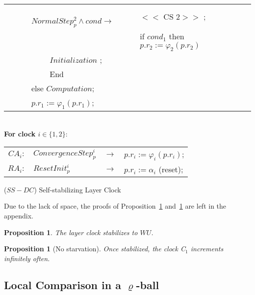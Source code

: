 \documentclass[11pt]{article}
\newtheorem{proposition}[theorem]{Proposition}
\newcommand{\text}[1]{\mbox{#1}}
\begin{document}
\begin{algorithm}
\begin{footnotesize}
\begin{tabular}{@{}rlcll}
     &&&  \  \ \ \text{  } $NormalStep_{p}^{2}\wedge cond\rightarrow $ & $<<\mbox{ CS 2}>> $  ;\\
     &&&                                                       & if $cond_1$ then $p.r_{2}:=\varphi _{2}\left(p.r_{2}\right)$  \\
     &&&\  \ \ \text{  } $Initialization$ ; & \\
      &&&  \  \ \ \text{  } End & \\ 
      &&& else $Computation$; & \\
    &&& $p.r_1 := \varphi_1(p.r_1)$; &\\
\end{tabular}\\
\noindent
{\bf For clock $i \in \{ 1,2 \}$}:\\
\noindent
\hspace*{0.3cm}
\begin{tabular}{@{}rlcl}  
$CA_i:$ & $ConvergenceStep_p^i$ & $\longrightarrow$ &
   $p.r_i := \varphi_i(p.r_i)$;\\
   
$RA_i:$ & $ResetInit_p^i$ & $\longrightarrow$ &
   $p.r_i := \alpha_i$ (reset);\\  
   

\end{tabular}
\end{footnotesize}
\caption{($SS-DC$) Self-stabilizing Layer Clock}
\label{algo:layer_clock}
\end{algorithm}


Due to the lack of space, the proofs of Proposition~\ref{cor:WUstab} and~\ref{prop:nos} are left in the appendix.

\begin{proposition}
\label{cor:WUstab}
The layer clock stabilizes to $WU$.
\end{proposition}

\begin{proposition}[No starvation]
\label{prop:nos}
Once stabilized, the clock \emph{C}$_{1}$ increments infinitely often.
\end{proposition}


\subsection{Local Comparison in a $\varrho$-ball}
\end{document}
